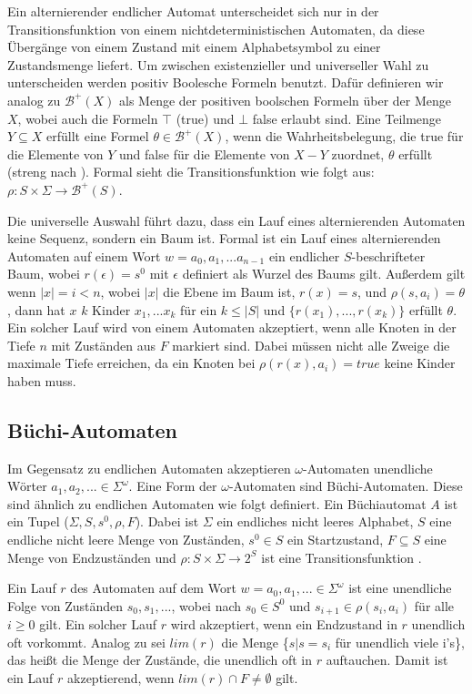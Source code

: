 Ein alternierender endlicher Automat unterscheidet sich nur in der Transitionsfunktion von einem nichtdeterministischen Automaten, da diese Übergänge von einem Zustand mit einem Alphabetsymbol zu einer Zustandsmenge liefert. Um zwischen existenzieller und universeller Wahl zu unterscheiden werden positiv Boolesche Formeln benutzt. Dafür definieren wir analog zu \cite{vardi+96} $\mathcal{B}^+(X)$ als Menge der positiven boolschen Formeln über der Menge $X$, wobei auch die Formeln $\top$ (true) und $\bot$ false erlaubt sind. Eine Teilmenge $Y \subseteq X$ erfüllt eine Formel $\theta \in \mathcal{B}^+(X)$, wenn die Wahrheitsbelegung, die true für die Elemente von $Y$ und false für die Elemente von $X-Y$ zuordnet, $\theta$ erfüllt (streng nach \cite{vardi+96}). Formal sieht die Transitionsfunktion wie folgt aus: $\rho: S \times \Sigma \rightarrow \mathcal{B}^+(S)$. 

Die universelle Auswahl führt dazu, dass ein Lauf eines alternierenden Automaten keine Sequenz, sondern ein Baum ist. Formal ist ein Lauf eines alternierenden Automaten auf einem Wort $w=a_0,a_1,...a_{n-1}$ ein endlicher $S$-beschrifteter Baum, wobei $r(\epsilon)=s^0$ mit $\epsilon$ definiert als Wurzel des Baums gilt. Außerdem gilt wenn $|x|=i<n$, wobei $|x|$ die Ebene im Baum ist, $r(x)=s$, und $\rho(s,a_i)=\theta$, dann hat $x$ $k$ Kinder $x_1,...x_k$ für ein $k\leq|S|$ und $\{r(x_1),...,r(x_k)\}$ erfüllt $\theta$. Ein solcher Lauf wird von einem Automaten akzeptiert, wenn alle Knoten in der Tiefe $n$ mit Zuständen aus $F$ markiert sind. Dabei müssen nicht alle Zweige die maximale Tiefe erreichen, da ein Knoten bei $\rho(r(x),a_i)=true$ keine Kinder haben muss.

\subsection{Büchi-Automaten}
Im Gegensatz zu endlichen Automaten akzeptieren $\omega$-Automaten unendliche Wörter \linebreak $a_1,a_2,...\in\Sigma^{\omega}$. Eine Form der $\omega$-Automaten sind Büchi-Automaten. Diese sind ähnlich zu endlichen Automaten wie folgt definiert. Ein Büchiautomat $A$ ist ein Tupel ($\Sigma, S, s^0, \rho, F$). Dabei ist $\Sigma$ ein endliches nicht leeres Alphabet, $S$ eine endliche nicht leere Menge von Zuständen, $s^0\in S$ ein Startzustand, $F\subseteq S$ eine Menge von Endzuständen und $\rho : S \times \Sigma \rightarrow 2^S$ ist eine Transitionsfunktion \cite{hofmann11,vardi+96}.

Ein Lauf $r$ des Automaten auf dem Wort $w=a_0,a_1,... \in \Sigma^{\omega}$ ist eine unendliche Folge von Zuständen $s_0,s_1,...$, wobei nach \cite{vardi+96} $s_0 \in S^0$ und $s_{i+1} \in \rho(s_i, a_i)$ für alle $i \geq 0$ gilt. Ein solcher Lauf $r$ wird akzeptiert, wenn ein Endzustand in $r$ unendlich oft vorkommt. Analog zu \cite{vardi+96} sei $lim(r)$ die Menge \{$s|s=s_i$ für unendlich viele i's\}, das heißt die Menge der Zustände, die unendlich oft in $r$ auftauchen. Damit ist ein Lauf $r$ akzeptierend, wenn $lim(r)\cap F \neq \emptyset$ gilt.

